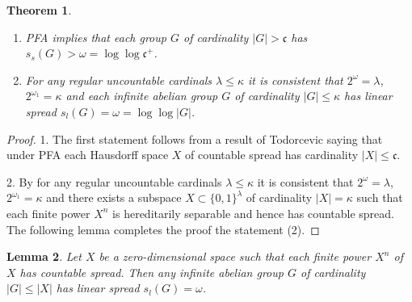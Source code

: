 \documentclass[11pt, twoside]{amsart}
\newtheorem{theorem}{Theorem}
\newtheorem{lemma}[theorem]{Lemma}
\theoremstyle{definition}
\begin{document}
\begin{theorem} \begin{enumerate}
\item PFA implies that each group $G$ of cardinality $|G|>\mathfrak c$ has $s_s(G)>{\omega}=\log\log \mathfrak c^+$.
\item For any regular uncountable cardinals $\lambda\le\kappa$ it is consistent that $2^{\omega}=\lambda$, $2^{{\omega}_1}=\kappa$ and each infinite abelian group $G$ of cardinality $|G|\le \kappa$ has linear spread $s_l(G)={\omega}=\log\log|G|$.
\end{enumerate}
\end{theorem}

\begin{proof} 1. The first statement follows from a result of Todorcevic \cite[8.12]{Tod} saying that under PFA each Hausdorff space $X$ of countable spread has cardinality $|X|\le\mathfrak c$.
\smallskip

2. By \cite[4.10]{Juh02} for any regular uncountable cardinals $\lambda\le\kappa$ it is consistent that $2^{\omega}=\lambda$, $2^{{\omega}_1}=\kappa$ and there exists a subspace $X\subset \{0,1\}^\lambda$ of cardinality $|X|=\kappa$ such that each finite power $X^n$ is hereditarily separable and hence has countable spread. The following lemma completes the proof the statement (2).
\end{proof}

\begin{lemma} Let $X$ be a zero-dimensional space such that each finite power $X^n$ of $X$ has countable spread. Then any infinite abelian group $G$ of cardinality $|G|\le |X|$ has linear spread $s_l(G)={\omega}$.
\end{lemma}
\end{document}
